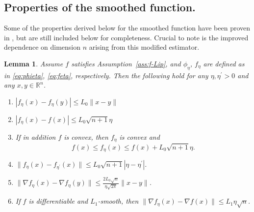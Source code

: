 \documentclass[11pt,reqno]{amsart}
\newcommand{\1}{{\bf 1}}
\newcommand{\2}{{\bf 2}}
\newcommand{\mr}[1]{{\color{blue}#1}}
\newcommand{\pc}[1]{{\color{cyan}#1}}
\newcommand{\R}{\mathbb R}
\numberwithin{equation}{section}
\newtheorem{lemma}{Lemma}[section]
\theoremstyle{remark}
\begin{document}
		\subsection{Properties of the smoothed function.}\label{sec:smoothproperties}
		Some of the properties derived below for the smoothed function have been proven in \cite{nesterov2017random}, but are still included below for completeness. Crucial to note is the improved dependence on dimension $n$ arising from this modified estimator. 
		\begin{lemma}\label{Lemma:SmoothProperties} %
			Assume $f$ satisfies Assumption~\ref{ass:f-Lip}, and $ \phi_{\eta}$, $f_{\eta}$ are defined as in \eqref{eq:phieta}, \eqref{eq:feta}, respectively. Then the following hold for any $\eta, \eta^{\prime} > 0$ and any $x,y \in \R^n$. %
			\begin{enumerate}[label=\alph*.]
				\item \label{Lemma:b}$|f_{\eta}(x)-f_{\eta}(y)| \leq L_0\|x-y\|$ %
				\item \label{Lemma:c}$|f_{\eta}(x)-f(x)| \leq L_0\sqrt{n+1}\eta$ %
				\item \label{Lemma:d} If in addition $f$ is convex, then $f_\eta$ is convex and %
				\begin{equation}\label{eq:Lemmad}
					f(x) \leq f_\eta(x) \leq f(x)+L_0\sqrt{n+1}\eta.
				\end{equation}
				\item \label{Lemma:e} $\|f_\eta(x)-f_{\eta^{\prime}}(x)\| \leq L_0\sqrt{n+1}|\eta-\eta^{\prime}|$.
				\item \label{Lemma:f} $\|\nabla f_{\eta}(x) - \nabla f_{\eta}(y)\| \leq \frac{2L_0\sqrt{n}}{\eta \sqrt{2 \pi}}\|x-y\|$. %
				\item \label{Lemma:g} If $f$ is differentiable and $L_1$-smooth, then $\|\nabla f_{\eta}(x) - \nabla f(x)\| \leq L_1\eta \sqrt{n}$. %
			\end{enumerate}
		\end{lemma}
\end{document}
